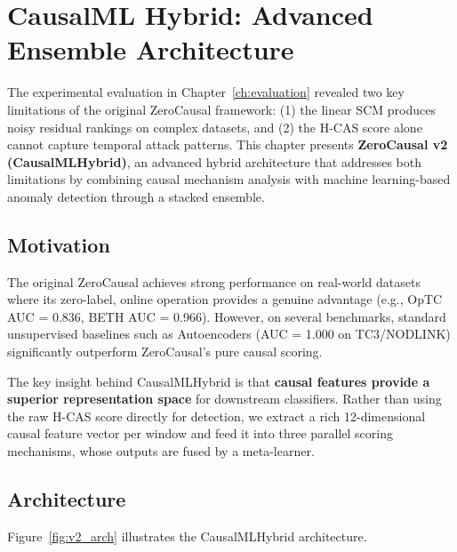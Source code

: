 \chapter{CausalML Hybrid: Advanced Ensemble Architecture}
\label{ch:causalml}

The experimental evaluation in Chapter~\ref{ch:evaluation} revealed two key limitations of the original ZeroCausal framework: (1) the linear SCM produces noisy residual rankings on complex datasets, and (2) the H-CAS score alone cannot capture temporal attack patterns. This chapter presents \textbf{ZeroCausal v2 (CausalMLHybrid)}, an advanced hybrid architecture that addresses both limitations by combining causal mechanism analysis with machine learning-based anomaly detection through a stacked ensemble.

\section{Motivation}

The original ZeroCausal achieves strong performance on real-world datasets where its zero-label, online operation provides a genuine advantage (e.g., OpTC AUC = 0.836, BETH AUC = 0.966). However, on several benchmarks, standard unsupervised baselines such as Autoencoders (AUC = 1.000 on TC3/NODLINK) significantly outperform ZeroCausal's pure causal scoring.

The key insight behind CausalMLHybrid is that \textbf{causal features provide a superior representation space} for downstream classifiers. Rather than using the raw H-CAS score directly for detection, we extract a rich 12-dimensional causal feature vector per window and feed it into three parallel scoring mechanisms, whose outputs are fused by a meta-learner.

\section{Architecture}

Figure~\ref{fig:v2_arch} illustrates the CausalMLHybrid architecture.

